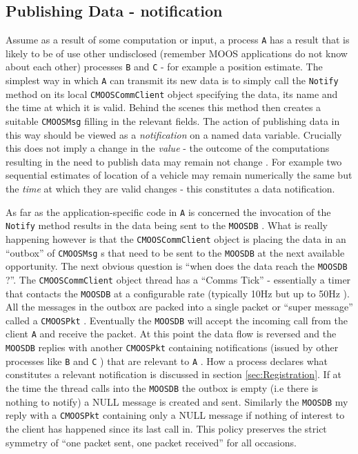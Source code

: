 \documentclass[a4paper,10pt]{article}
\newcommand{\Code}[1]{\texttt{#1} }
\newcommand{\code}[1]{\Code{#1} }
\newcommand{\DB}   {\code{{MOOSDB}}}
\begin{document}
\subsection{Publishing Data - notification} Assume as a result of
 some computation or input, a process \code{A} has a result that
is likely to be of use other undisclosed (remember MOOS
applications do not know about each other) processes \code{B} and
\code{C} - for example a position estimate. The simplest way in
which \code{A} can transmit its new data is to simply call the
\code{Notify} method on its local \code{CMOOSCommClient} object
specifying the data, its name and the time at which it is valid.
Behind the scenes this method then creates a suitable
\code{CMOOSMsg} filling in the relevant fields. The action of
publishing data in this way should be viewed as a
{\emph{notification}} on a named data variable. Crucially this
does not imply a change in the {\emph{value}} - the outcome of the
computations resulting in the need to publish data may remain not
change . For example two sequential estimates of location of a
vehicle may remain numerically the same but the {\it{time}} at
which they are valid changes - this constitutes a data
notification.

As far as the application-specific code in \code{A} is concerned
the invocation of the \code{Notify} method results in the data
being sent to the \DB. What is really happening however is that
the \code{CMOOSCommClient} object is placing the data in an
``outbox''  of \code{CMOOSMsg}s that need to be sent to the \DB at
the next available opportunity. The next obvious question is
``when does the  data reach the \DB?''. The \code{CMOOSCommClient}
object thread has a ``Comms Tick'' - essentially a timer that
contacts the \DB at a configurable rate (typically 10Hz but up to
50Hz ). All the messages in the outbox are packed into a single
packet or ``super message'' called a \code{CMOOSPkt}. Eventually
the \DB will accept the incoming call from the client \code{A} and
receive the packet. At this point the data flow is reversed and
the \DB replies with another \code{CMOOSPkt} containing
notifications (issued by other processes like \code{B} and
\code{C}) that are relevant to  \code{A}. How a process declares
what constitutes a relevant notification is discussed in section
\ref{sec:Registration}. If at the time the thread calls into the
\DB the outbox is empty (i.e there is nothing to notify) a NULL
message is created and sent. Similarly the \DB my reply with a
\code{CMOOSPkt} containing only a NULL message if  nothing of
interest to the client has happened since its last call in. This
policy preserves the strict symmetry of ``one packet sent, one
packet received'' for all occasions.
\end{document}
